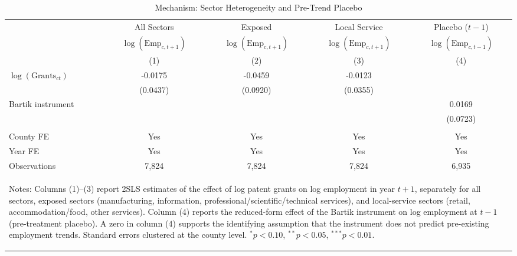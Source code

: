 \begin{table}[htbp]
\centering
\caption{Mechanism: Sector Heterogeneity and Pre-Trend Placebo}
\label{tab:mechanism}
\begin{tabular}{lcccc}
\hline\hline
 & All Sectors & Exposed & Local Service & Placebo ($t-1$) \\
 & $\log(\text{Emp}_{c,t+1})$ & $\log(\text{Emp}_{c,t+1})$ & $\log(\text{Emp}_{c,t+1})$ & $\log(\text{Emp}_{c,t-1})$ \\
 & (1) & (2) & (3) & (4) \\
\hline
$\log(\text{Grants}_{ct})$ & -0.0175 & -0.0459 & -0.0123 & \\
 & (0.0437) & (0.0920) & (0.0355) & \\
Bartik instrument & & & & 0.0169 \\
 & & & & (0.0723) \\
\\[6pt]
County FE & Yes & Yes & Yes & Yes \\
Year FE & Yes & Yes & Yes & Yes \\
Observations & 7,824 & 7,824 & 7,824 & 6,935 \\
\hline\hline
\multicolumn{5}{p{0.95\textwidth}}{\begin{flushleft}\small
Notes: Columns (1)--(3) report 2SLS estimates of the effect of log patent grants on log employment in year $t+1$, separately for all sectors, exposed sectors (manufacturing, information, professional/scientific/technical services), and local-service sectors (retail, accommodation/food, other services). Column (4) reports the reduced-form effect of the Bartik instrument on log employment at $t-1$ (pre-treatment placebo). A zero in column (4) supports the identifying assumption that the instrument does not predict pre-existing employment trends. Standard errors clustered at the county level. $^{*}p<0.10$, $^{**}p<0.05$, $^{***}p<0.01$.
\end{flushleft}}
\end{tabular}
\end{table}
